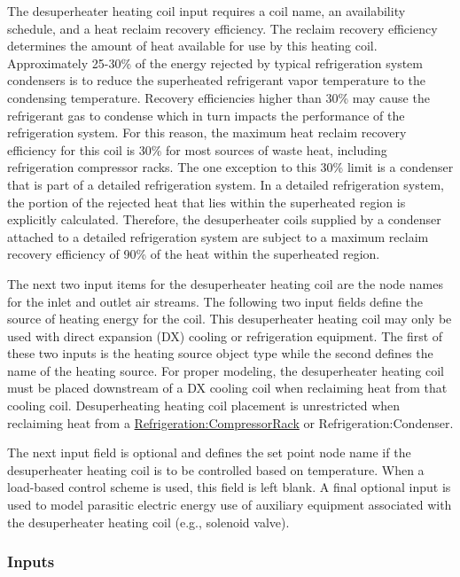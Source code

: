The desuperheater heating coil input requires a coil name, an availability schedule, and a heat reclaim recovery efficiency. The reclaim recovery efficiency determines the amount of heat available for use by this heating coil. Approximately 25-30\% of the energy rejected by typical refrigeration system condensers is to reduce the superheated refrigerant vapor temperature to the condensing temperature. Recovery efficiencies higher than 30\% may cause the refrigerant gas to condense which in turn impacts the performance of the refrigeration system. For this reason, the maximum heat reclaim recovery efficiency for this coil is 30\% for most sources of waste heat, including refrigeration compressor racks. The one exception to this 30\% limit is a condenser that is part of a detailed refrigeration system. In a detailed refrigeration system, the portion of the rejected heat that lies within the superheated region is explicitly calculated. Therefore, the desuperheater coils supplied by a condenser attached to a detailed refrigeration system are subject to a maximum reclaim recovery efficiency of 90\% of the heat within the superheated region.

The next two input items for the desuperheater heating coil are the node names for the inlet and outlet air streams. The following two input fields define the source of heating energy for the coil. This desuperheater heating coil may only be used with direct expansion (DX) cooling or refrigeration equipment. The first of these two inputs is the heating source object type while the second defines the name of the heating source. For proper modeling, the desuperheater heating coil must be placed downstream of a DX cooling coil when reclaiming heat from that cooling coil. Desuperheating heating coil placement is unrestricted when reclaiming heat from a \hyperref[refrigerationcompressorrack]{Refrigeration:CompressorRack} or Refrigeration:Condenser.

The next input field is optional and defines the set point node name if the desuperheater heating coil is to be controlled based on temperature. When a load-based control scheme is used, this field is left blank. A final optional input is used to model parasitic electric energy use of auxiliary equipment associated with the desuperheater heating coil (e.g., solenoid valve).

\subsubsection{Inputs}\label{inputs-5-013}


